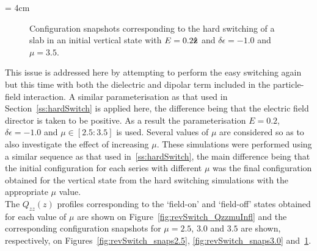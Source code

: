 \picW = 4cm
\begin{figure}
	\centering
	\caption{Configuration snapshots corresponding to the hard switching of a slab in an
	initial vertical state with $E=0.2\mathbf{\hat{z} }$ and $\delta\epsilon = -1.0$ and $\mu = 3.5$.}
	\label{fig:revSwitch_snaps3.5}
\end{figure}



This issue is addressed here by
attempting to perform the easy switching again but this time with both the dielectric and dipolar 
term included in the particle-field interaction. A similar parameterisation as that used in
Section~\ref{ss:hardSwitch} is applied here, the difference being that the electric field
director is taken to be positive. As a result the parameterisation $E=0.2$, $\delta\epsilon = -1.0$ and
$\mu\in[2.5:3.5]$ is used. Several values of $\mu$ are considered so as to also investigate the
effect of increasing $\mu$. These simulations were performed using a similar sequence as 
that used in~\ref{ss:hardSwitch}, the main difference being that the initial configuration for each
series with different $\mu$ was the final configuration obtained for the vertical state 
from the  hard switching simulations with the appropriate $\mu$ value.\\
The $Q_{zz}(z)$ profiles corresponding to the `field-on' and `field-off' states obtained for each value
of $\mu$ are shown on Figure~\ref{fig:revSwitch_QzzmuInfl} and the corresponding 
configuration snapshots for $\mu = 2.5$, $3.0$ and $3.5$ are shown, respectively, on
Figures~\ref{fig:revSwitch_snaps2.5}, \ref{fig:revSwitch_snaps3.0}
and~\ref{fig:revSwitch_snaps3.5}.\\


